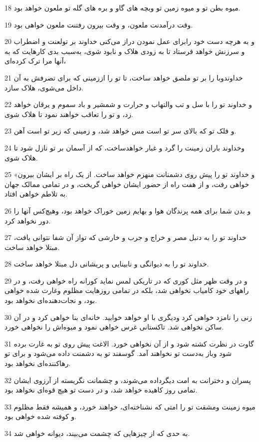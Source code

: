 \par 18 میوه بطن تو و میوه زمین تو وبچه های گاو و بره های گله تو ملعون خواهد بود.
\par 19 وقت درآمدنت ملعون، و وقت بیرون رفتنت ملعون خواهی بود.
\par 20 و به هر‌چه دست خود رابرای عمل نمودن دراز می‌کنی خداوند بر تولعنت و اضطراب و سرزنش خواهد فرستاد تا به زودی هلاک و نابود شوی، به‌سبب بدی کارهایت که به آنها مرا ترک کرده‌ای،
\par 21 خداوندوبا را بر تو ملصق خواهد ساخت، تا تو را اززمینی که برای تصرفش به آن داخل می‌شوی، هلاک سازد.
\par 22 و خداوند تو را با سل و تب والتهاب و حرارت و شمشیر و باد سموم و یرقان خواهد زد، و تو را تعاقب خواهند نمود تا هلاک شوی.
\par 23 و فلک تو که بالای سر تو است مس خواهد شد، و زمینی که زیر تو است آهن.
\par 24 وخداوند باران زمینت را گرد و غبار خواهدساخت، که از آسمان بر تو نازل شود تا هلاک شوی.
\par 25 «و خداوند تو را پیش روی دشمنانت منهزم خواهد ساخت. از یک راه بر ایشان بیرون خواهی رفت، و از هفت راه از حضور ایشان خواهی گریخت، و در تمامی ممالک جهان به تلاطم خواهی افتاد.
\par 26 و بدن شما برای همه پرندگان هوا و بهایم زمین خوراک خواهد بود، وهیچ‌کس آنها را دور نخواهد کرد.
\par 27 خداوند تو را به دنبل مصر و خراج و جرب و خارشی که تواز آن شفا نتوانی یافت، مبتلا خواهد ساخت.
\par 28 خداوند تو را به دیوانگی و نابینایی و پریشانی دل مبتلا خواهد ساخت.
\par 29 و در وقت ظهر مثل کوری که در تاریکی لمس نماید کورانه راه خواهی رفت، و در راههای خود کامیاب نخواهی شد، بلکه در تمامی روزهایت مظلوم وغارت شده خواهی بود، و نجات‌دهنده‌ای نخواهد بود.
\par 30 زنی را نامزد خواهی کرد ودیگری با او خواهد خوابید. خانه‌ای بنا خواهی کرد و در آن ساکن نخواهی شد. تاکستانی غرس خواهی نمود و میوه‌اش را نخواهی خورد.
\par 31 گاوت در نظرت کشته شود و از آن نخواهی خورد. الاغت پیش روی تو به غارت برده شود وباز به‌دست تو نخواهند آمد. گوسفند تو به دشمنت داده می‌شود و برای تو رهاکننده‌ای نخواهد بود.
\par 32 پسران و دخترانت به امت دیگرداده می‌شوند، و چشمانت نگریسته از آرزوی ایشان تمامی روز کاهیده خواهد شد، و در دست تو هیچ قوه‌ای نخواهد بود.
\par 33 میوه زمینت ومشقت تو را امتی که نشناخته‌ای، خواهند خورد، و همیشه فقط مظلوم و کوفته شده خواهی بود.
\par 34 به حدی که از چیزهایی که چشمت می‌بیند، دیوانه خواهی شد.
